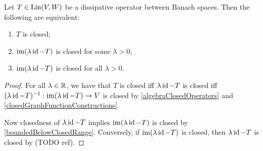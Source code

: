 \begin{proposition} \label{closureDissipativeOperator}
Let $T\in \operatorname{Lin}(V, W)$ be a dissipative operator between Banach spaces. Then the following are equivalent:
\begin{enumerate}
\item $T$ is closed;
\item $\operatorname{im}(\lambda\operatorname{id} - T)$ is closed for some $\lambda > 0$;
\item $\operatorname{im}(\lambda\operatorname{id} - T)$ is closed for all $\lambda > 0$.
\end{enumerate}
\end{proposition}
\begin{proof}
For all $\lambda\in\mathbb{R}$, we have that $T$ is closed iff $\lambda\operatorname{id} - T$ is closed iff $(\lambda\operatorname{id} - T)^{-1}: \operatorname{im}(\lambda\operatorname{id} - T) \to V$ is closed by \ref{algebraClosedOperators} and \ref{closedGraphFunctionConstructions}.

Now closedness of $\lambda\operatorname{id} - T$ implies $\operatorname{im}(\lambda\operatorname{id} - T)$ is closed by \ref{boundedBelowClosedRange}. Conversely, if $\operatorname{im}(\lambda\operatorname{id} - T)$ is closed, then $\lambda\operatorname{id} - T$ is closed by (TODO ref).
\end{proof}

